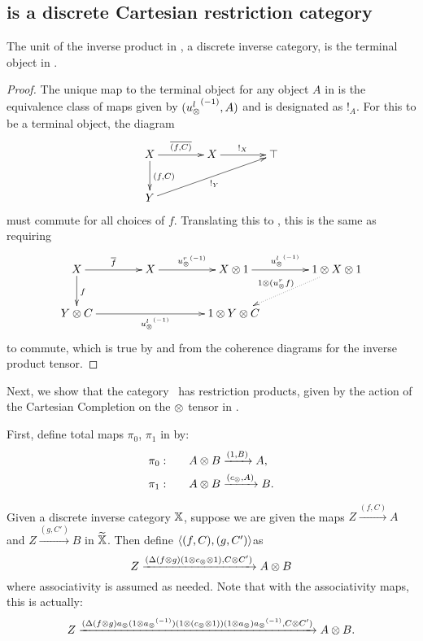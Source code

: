 \subsection{\hypXt is a discrete Cartesian restriction category} %
\label{sec:the_category_hypxt_is_cartesian}



\begin{lemma}\label{lem:tensor_unit_of_x_is_terminal_object_of_xt}
  The unit of the inverse product in \X, a discrete inverse category,  is the terminal object in \Xt.
\end{lemma}
\begin{proof}
  The unique map to the terminal object for any object $A$ in \Xt is the equivalence class of maps
  given by $({u_{\otimes}^l}^{(-1)},A)$ and is designated as $!_A$. For this to be a terminal object, the diagram
  \[
    \xymatrix @C=40pt @R=25pt{
      X \ar[r]^{\restr{(f,C)}} \ar[d]^{(f,C)} & X \ar[r]^{!_X}  &\top  \\
      Y \ar[urr]_{!_Y}
    }
  \]
  must commute for all choices of $f$. Translating this to \X, this is the same as requiring
  \[
    \xymatrix @C=40pt @R=25pt{
      X \ar[r]^{\restr{f}} \ar[d]^{f} & X \ar[r]^{\inv{\usr} }
      & X\*1 \ar[r]^{\inv{\usl}}  &1\*X\*1 \ar@{.>}[dl]_{1\*(\usr f)}  \\
      Y \*C\ar[rr]_{\inv{\usl}} & & 1 \*Y \* C
    }
  \]
  to commute, which is true by \rone and from the coherence diagrams for the inverse product tensor.
\end{proof}

Next, we show that the category \Xt\ has restriction products, given by the action of the Cartesian
Completion on the $\otimes$ tensor in \X.

First, define total maps $\pi_0$, $\pi_1$ in \Xt by:
\begin{align}
  \pi_0:\qquad & A \otimes B \xrightarrow{(1,B)} A, \label{eq:defn:pia}\\
  \pi_1:\qquad & A \otimes B \xrightarrow{(c_{\otimes},A)} B. \label{eq:defn:pib}
\end{align}

\begin{definition}\label{def:product_map_in_xt}
  Given a discrete inverse category $\mathbb{X}$, suppose we are given the maps $ Z \xrightarrow{(f,C)} A$
  and $Z \xrightarrow{(g,C')} B$ in $\widetilde{\mathbb{X}}$. Then define $\langle(f,C),(g,C')\rangle$as
  \begin{equation}
    Z\xrightarrow{(\Delta  ( f \otimes g )  (1\otimes c_{\otimes} \otimes 1), C\otimes C')} A \otimes B\label{eq:defn:fg}
  \end{equation}
  where associativity is assumed as needed. Note that with the associativity maps, this is actually:
  \begin{equation}
    Z\xrightarrow{(\Delta  ( f \otimes g )  a_{\otimes} (1\otimes{a_{\otimes}}^{(-1)})
      (1\otimes (c_{\otimes} \otimes 1)) (1\otimes a_{\otimes}) {a_{\otimes}}^{(-1)}, C\otimes C')} A \otimes B.\label{eq:defn:fg2}
  \end{equation}
\end{definition}

